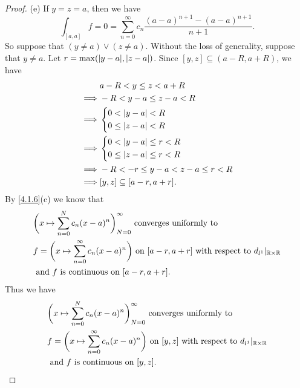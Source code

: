 \begin{proof}{(e)}
  If \(y = z = a\), then we have
  \[
    \int_{[a, a]} f = 0 = \sum_{n = 0}^\infty c_n \dfrac{(a - a)^{n + 1} - (a - a)^{n + 1}}{n + 1}.
  \]
  So suppose that \((y \neq a) \lor (z \neq a)\).
  Without the loss of generality, suppose that \(y \neq a\).
  Let \(r = \max(\abs{y - a}, \abs{z - a})\).
  Since \([y, z] \subseteq (a - R, a + R)\), we have
  \begin{align*}
             & a - R < y \leq z < a + R              \\
    \implies & -R < y - a \leq z - a < R             \\
    \implies & \begin{dcases}
                 0 < \left\lvert y - a\right\rvert < R \\
                 0 \leq \left\lvert z - a\right\rvert < R
               \end{dcases}                 \\
    \implies & \begin{dcases}
                 0 < \left\lvert y - a\right\rvert \leq r < R \\
                 0 \leq \left\lvert z - a\right\rvert \leq r < R
               \end{dcases}          \\
    \implies & -R < -r \leq y - a < z - a \leq r < R \\
    \implies & [y, z] \subseteq [a - r, a + r].
  \end{align*}
  By \cref{4.1.6}(c) we know that
  \begin{align*}
     & \bigg(x \mapsto \sum_{n = 0}^N c_n (x - a)^n\bigg)_{N = 0}^\infty \text{ converges uniformly to }                                       \\
     & f = \bigg(x \mapsto \sum_{n = 0}^\infty c_n (x - a)^n\bigg) \text{ on } [a - r, a + r] \text{ with respect to } d_{l^1}|_{\mathbb{R} \times \mathbb{R}} \\
     & \text{ and } f \text{ is continuous on } [a - r, a + r].
  \end{align*}
  Thus we have
  \begin{align*}
     & \bigg(x \mapsto \sum_{n = 0}^N c_n (x - a)^n\bigg)_{N = 0}^\infty \text{ converges uniformly to }                               \\
     & f = \bigg(x \mapsto \sum_{n = 0}^\infty c_n (x - a)^n\bigg) \text{ on } [y, z] \text{ with respect to } d_{l^1}|_{\mathbb{R} \times \mathbb{R}} \\
     & \text{ and } f \text{ is continuous on } [y, z].
  \end{align*}

\end{proof}
